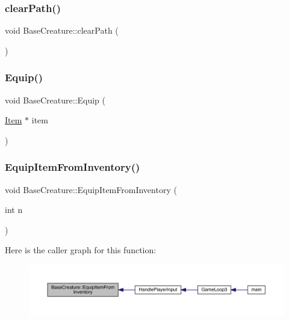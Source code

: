 \subsubsection{\texorpdfstring{clear\+Path()}{clearPath()}}
{\footnotesize\ttfamily void Base\+Creature\+::clear\+Path (\begin{DoxyParamCaption}{ }\end{DoxyParamCaption})}

\mbox{\label{class_base_creature_a82807038eafe46f7ac510a99a4cdc25e}} 
\subsubsection{\texorpdfstring{Equip()}{Equip()}}
{\footnotesize\ttfamily void Base\+Creature\+::\+Equip (\begin{DoxyParamCaption}\item[{\mbox{\hyperlink{class_item}{Item}} $\ast$}]{item }\end{DoxyParamCaption})}

\mbox{\label{class_base_creature_a637cb7174d9bb9677a21281ff19fb10a}} 
\subsubsection{\texorpdfstring{Equip\+Item\+From\+Inventory()}{EquipItemFromInventory()}}
{\footnotesize\ttfamily void Base\+Creature\+::\+Equip\+Item\+From\+Inventory (\begin{DoxyParamCaption}\item[{int}]{n }\end{DoxyParamCaption})}

Here is the caller graph for this function\+:
\nopagebreak
\begin{figure}[H]
\begin{center}
\leavevmode
\includegraphics[width=350pt]{class_base_creature_a637cb7174d9bb9677a21281ff19fb10a_icgraph}
\end{center}
\end{figure}
\mbox{\label{class_base_creature_ac04efe1dda147e264998609635baadb6}} 
